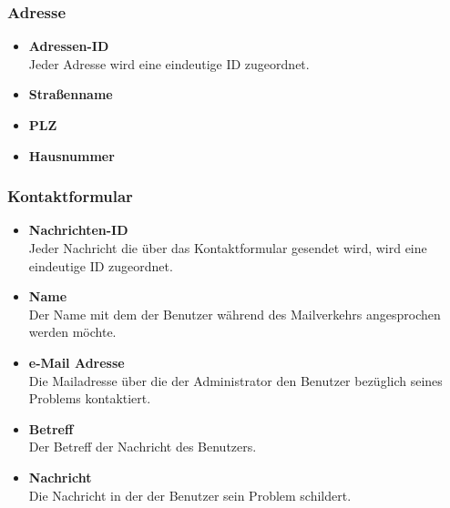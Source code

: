 \subsubsection*{Adresse}
	\begin{itemize}
	    \item \textbf{Adressen-ID}\hfill\\
	    Jeder Adresse wird eine eindeutige ID zugeordnet.
		\item \textbf{Straßenname}\hfill\\
		\item \textbf{PLZ} \hfill\\		
		\item \textbf{Hausnummer}\hfill\\
	\end{itemize}
\subsubsection*{Kontaktformular}
	\begin{itemize}
	    \item \textbf{Nachrichten-ID}\hfill\\
	    Jeder Nachricht die über das Kontaktformular gesendet wird, wird eine eindeutige ID zugeordnet.
		\item \textbf{Name} \hfill \\
		Der Name mit dem der Benutzer während des Mailverkehrs angesprochen werden möchte.
		\item \textbf{e-Mail Adresse} \hfill \\
		Die Mailadresse über die der Administrator den Benutzer bezüglich seines Problems kontaktiert. 
		\item \textbf{Betreff} \hfill \\
		Der Betreff der Nachricht des Benutzers.
		\item \textbf{Nachricht} \hfill \\
		Die Nachricht in der der Benutzer sein Problem schildert.
	\end{itemize}	
	

